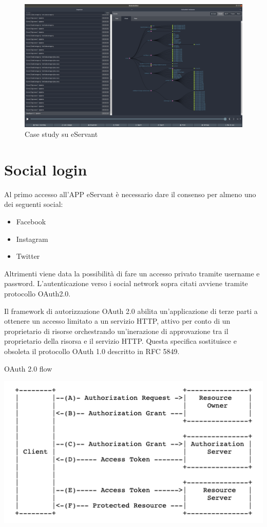 \begin{figure}[h!]
    \caption{Case study su eServant}
    \includegraphics[scale=0.2]{img/cap2/ngrx-eservant}
\end{figure}

\section{Social login}
Al primo accesso all'APP eServant è necessario dare il consenso per almeno uno dei seguenti social:
\begin{itemize}
\item Facebook
\item Instagram
\item Twitter
\end{itemize}

Altrimenti viene data la possibilità di fare un accesso privato tramite username e password.
L'autenticazione verso i social network sopra citati avviene tramite protocollo OAuth2.0.

Il framework di autorizzazione OAuth 2.0 abilita un'applicazione di terze parti a ottenere un accesso limitato a un servizio HTTP, attivo
per conto di un proprietario di risorse orchestrando un'inerazione di approvazione tra il proprietario della risorsa e il servizio HTTP.
Questa specifica sostituisce e obsoleta il protocollo OAuth 1.0 descritto in RFC 5849.

OAuth 2.0 flow 

\includegraphics[scale=0.60]{img/cap2/oauth20-1}\\

